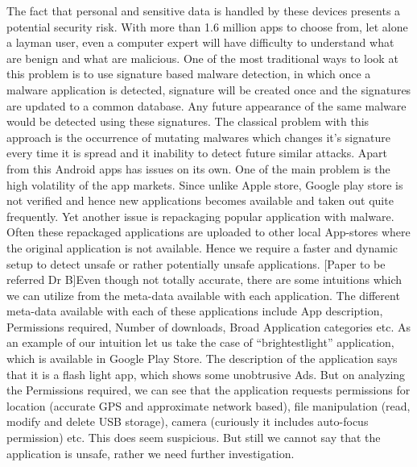 The fact that personal and sensitive data is handled by these devices presents a potential security risk. With more than 1.6 million apps to choose from, let alone a layman user, even a computer expert will have difficulty to understand what are benign and what are malicious. One of the most traditional ways to look at this problem is to use signature based malware detection, in which once a malware application is detected, signature will be created once and the signatures are updated to a common database. Any future appearance of the same malware would be detected using these signatures. The classical problem with this approach is the occurrence of mutating malwares which changes it’s signature every time it is spread and it inability to detect future similar attacks. Apart from this Android apps has issues on its own. One of the main problem is the high volatility of the app markets. Since unlike Apple store, Google play store is not verified and hence new applications becomes available and taken out quite frequently. Yet another issue is repackaging popular application with malware. Often these repackaged applications are uploaded to other local App-stores where the original application is not available. 
Hence we require a faster and dynamic setup to detect unsafe or rather potentially unsafe applications. [Paper to be referred Dr B]Even though not totally accurate, there are some intuitions which we can utilize from the meta-data available with each application. The different meta-data available with each of these applications include App description, Permissions required, Number of downloads, Broad Application categories etc. As an example of our intuition let us take the case of “brightestlight” application, which is available in Google Play Store. The description of the application says that it is a flash light app, which shows some unobtrusive Ads. But on analyzing the Permissions required, we can see that the application requests permissions for location (accurate GPS and approximate network based), file manipulation (read, modify and delete USB storage), camera (curiously it includes auto-focus permission) etc. This does seem suspicious. But still we cannot say that the application is unsafe, rather we need further investigation. 
